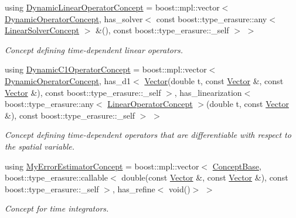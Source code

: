 \begin{DoxyCompactItemize}
using \hyperlink{group__ConceptGroup_ga015b0d099011a2ef73a16aa9b36a7346_ga015b0d099011a2ef73a16aa9b36a7346}{Dynamic\+Linear\+Operator\+Concept} = boost\+::mpl\+::vector$<$ \hyperlink{group__ConceptGroup_ga2c979d268f0ca7a436776a9631d10af7_ga2c979d268f0ca7a436776a9631d10af7}{Dynamic\+Operator\+Concept}, has\+\_\+solver$<$ const boost\+::type\+\_\+erasure\+::any$<$ \hyperlink{group__ConceptGroup_gac7d6a94c7131c8613e2ab26fddeb50bd_gac7d6a94c7131c8613e2ab26fddeb50bd}{Linear\+Solver\+Concept} $>$ \&(), const boost\+::type\+\_\+erasure\+::\+\_\+self $>$ $>$
\begin{DoxyCompactList}\small\item\em Concept defining time-\/dependent linear operators. \end{DoxyCompactList}\item 
using \hyperlink{group__ConceptGroup_gaa7ef0ce2d66b0610035541b580564b11_gaa7ef0ce2d66b0610035541b580564b11}{Dynamic\+C1\+Operator\+Concept} = boost\+::mpl\+::vector$<$ \hyperlink{group__ConceptGroup_ga2c979d268f0ca7a436776a9631d10af7_ga2c979d268f0ca7a436776a9631d10af7}{Dynamic\+Operator\+Concept}, has\+\_\+d1$<$ \hyperlink{classSpacy_1_1Vector}{Vector}(double t, const \hyperlink{classSpacy_1_1Vector}{Vector} \&, const \hyperlink{classSpacy_1_1Vector}{Vector} \&), const boost\+::type\+\_\+erasure\+::\+\_\+self $>$, has\+\_\+linearization$<$ boost\+::type\+\_\+erasure\+::any$<$ \hyperlink{group__ConceptGroup_gaf0e18e41c434cfceb77ccb8e785a8055_gaf0e18e41c434cfceb77ccb8e785a8055}{Linear\+Operator\+Concept} $>$(double t, const \hyperlink{classSpacy_1_1Vector}{Vector} \&), const boost\+::type\+\_\+erasure\+::\+\_\+self $>$ $>$
\begin{DoxyCompactList}\small\item\em Concept defining time-\/dependent operators that are differentiable with respect to the spatial variable. \end{DoxyCompactList}\item 
using \hyperlink{group__ConceptGroup_ga6b5c97b0e58318ef98c43a9b8a7dae08_ga6b5c97b0e58318ef98c43a9b8a7dae08}{My\+Error\+Estimator\+Concept} = boost\+::mpl\+::vector$<$ \hyperlink{group__ConceptGroup_ga63426675cc05ccce03ead56a4fa90d96_ga63426675cc05ccce03ead56a4fa90d96}{Concept\+Base}, boost\+::type\+\_\+erasure\+::callable$<$ double(const \hyperlink{classSpacy_1_1Vector}{Vector} \&, const \hyperlink{classSpacy_1_1Vector}{Vector} \&), const boost\+::type\+\_\+erasure\+::\+\_\+self $>$, has\+\_\+refine$<$ void()$>$ $>$
\begin{DoxyCompactList}\small\item\em Concept for time integrators. \end{DoxyCompactList}\item 

\end{DoxyCompactItemize}
